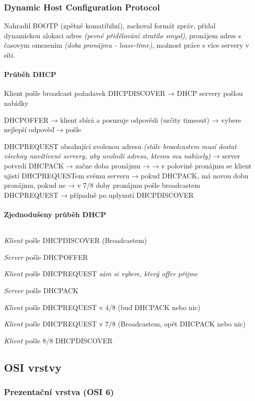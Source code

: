 \documentclass[10pt,a4paper]{article}
\begin{document}
\subsubsection{Dynamic Host Configuration Protocol}

Nahradil BOOTP (zpětně komatibilní), zachoval formát zpráv, přidal dynamickou alokaci adres \textit{(pevné přidělování ztratilo smysl)}, pronájem adres s časovym omezením \textit{(doba pronájmu - lease-time)}, možnost práce s více servery v síti.


\paragraph{Průběh DHCP} Klient pošle broadcast požadavek DHCPDISCOVER → DHCP servery pošlou nabídky 

DHCPOFFER → klient sbírá a posuzuje odpovědi (určity timeout) → vybere nejlepší odpověď → pošle 

DHCPREQUEST obsahující zvolenou adresu \textit{(stále broadcastem musí dostat všechny navštívené servery, aby uvolnili adresu, kterou mu nabízely)} → server potvrdí DHCPACK → začne doba pronájmu → → v polovině pronájmu se klient ujistí DHCPREQUESTem svému serveru → pokud DHCPACK, má novou dobu pronájmu, pokud ne → v $7/8$ doby pronájmu pošle broadcastem DHCPREQUEST → případně po uplynutí  DHCPDISCOVER

\paragraph{Zjednodušeny průběh DHCP} $ $

\textit{Klient} pošle DHCPDISCOVER (Broadcastem)

\textit{Server} pošle DHCPOFFER

\textit{Klient} pošle DHCPREQUEST \textit{sám si vybere, který offer přijme}

\textit{Server} pošle DHCPACK

\textit{Klient} pošle DHCPREQUEST v $4/8$ (buď DHCPACK nebo nic)

\textit{Klient} pošle DHCPREQUEST v $7/8$ (Broadcastem, opět DHCPACK nebo nic)

\textit{Klient} pošle $8/8$ DHCPDISCOVER

\subsection{OSI vrstvy}

\subsubsection{Prezentační vrstva (OSI 6)}
\end{document}
